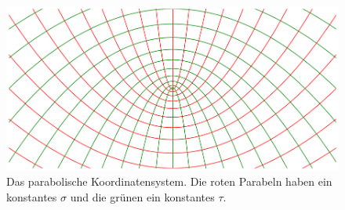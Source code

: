 \begin{figure}
    \centering
    \includegraphics[scale=0.4]{papers/parzyl/img/koordinaten.png}
    \caption{Das parabolische Koordinatensystem. Die roten Parabeln haben ein 
    konstantes $\sigma$ und die grünen ein konstantes $\tau$.}
    \label{parzyl:fig:cordinates}
\end{figure}

